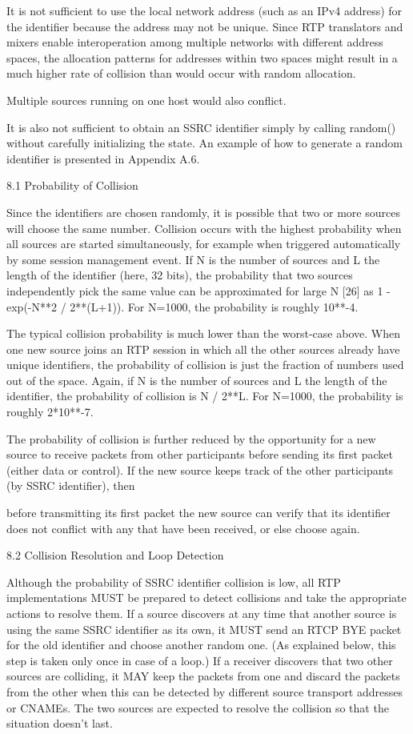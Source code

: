 \documentclass{article}
\begin{document}
It is not sufficient to use the local network address (such as an IPv4 address) for the identifier because the address may not be unique.  Since RTP translators and mixers enable interoperation among multiple networks with different address spaces, the allocation patterns for addresses within two spaces might result in a much higher rate of collision than would occur with random allocation.

Multiple sources running on one host would also conflict.

It is also not sufficient to obtain an SSRC identifier simply by calling random() without carefully initializing the state.  An example of how to generate a random identifier is presented in Appendix A.6.

8.1 Probability of Collision

Since the identifiers are chosen randomly, it is possible that two or more sources will choose the same number.  Collision occurs with the highest probability when all sources are started simultaneously, for example when triggered automatically by some session management event.  If N is the number of sources and L the length of the identifier (here, 32 bits), the probability that two sources independently pick the same value can be approximated for large N [26] as 1 - exp(-N**2 / 2**(L+1)).  For N=1000, the probability is roughly 10**-4.

The typical collision probability is much lower than the worst-case above.  When one new source joins an RTP session in which all the other sources already have unique identifiers, the probability of collision is just the fraction of numbers used out of the space. Again, if N is the number of sources and L the length of the identifier, the probability of collision is N / 2**L.  For N=1000, the probability is roughly 2*10**-7.

The probability of collision is further reduced by the opportunity for a new source to receive packets from other participants before sending its first packet (either data or control).  If the new source keeps track of the other participants (by SSRC identifier), then

before transmitting its first packet the new source can verify that its identifier does not conflict with any that have been received, or else choose again.

8.2 Collision Resolution and Loop Detection

Although the probability of SSRC identifier collision is low, all RTP implementations MUST be prepared to detect collisions and take the appropriate actions to resolve them.  If a source discovers at any time that another source is using the same SSRC identifier as its own, it MUST send an RTCP BYE packet for the old identifier and choose another random one.  (As explained below, this step is taken only once in case of a loop.)  If a receiver discovers that two other sources are colliding, it MAY keep the packets from one and discard the packets from the other when this can be detected by different source transport addresses or CNAMEs.  The two sources are expected to resolve the collision so that the situation doesn't last.
\end{document}
